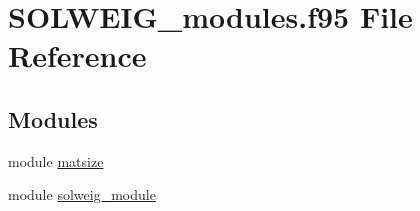 \hypertarget{_s_o_l_w_e_i_g__modules_8f95}{}\section{S\+O\+L\+W\+E\+I\+G\+\_\+modules.\+f95 File Reference}
\label{_s_o_l_w_e_i_g__modules_8f95}
\subsection*{Modules}
\begin{DoxyCompactItemize}
\item 
module \hyperlink{namespacematsize}{matsize}
\item 
module \hyperlink{namespacesolweig__module}{solweig\+\_\+module}
\end{DoxyCompactItemize}
